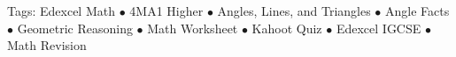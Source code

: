 \documentclass[11pt,a4paper]{article}
\begin{document}
\vspace{14pt}
\begin{center}
  \sffamily\scriptsize\textcolor{textmuted}{
    Tags: Edexcel Math $\bullet$ 4MA1 Higher $\bullet$ Angles, Lines, and Triangles $\bullet$ Angle Facts $\bullet$ Geometric Reasoning $\bullet$ Math Worksheet $\bullet$ Kahoot Quiz $\bullet$ Edexcel IGCSE $\bullet$ Math Revision
  }
\end{center}
\end{document}
